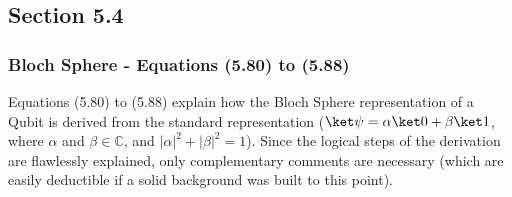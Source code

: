 \subsection{Section 5.4}
\label{sec:noson-section-5-4}

\subsubsection{Bloch Sphere - Equations (5.80) to (5.88)}
\label{sec:noson-bloch-sphere-eq-5-80-to-5-88}
Equations (5.80) to (5.88) explain how the Bloch Sphere representation of a Qubit is derived
from the standard representation
($\ket\psi = \alpha \ket0 + \beta \ket1$, where $\alpha$ and $\beta \in \mathbb{C}$,
and $|\alpha|^2 + |\beta|^2 = 1$).
Since the logical steps of the derivation are flawlessly explained,
only complementary comments are necessary
(which are easily deductible if a solid background was built to this point).

